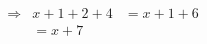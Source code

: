 \documentclass[preview]{standalone}
\begin{document}
\begin{align*}
\Rightarrow & x+1+2+4& =x+1+6\\ & = x+7
\end{align*}
\end{document}
